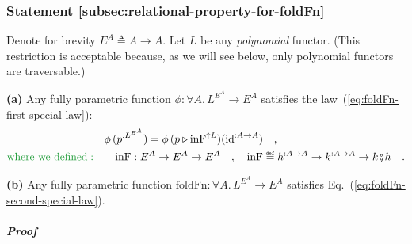 \subsubsection{Statement \label{subsec:relational-property-for-foldFn}\ref{subsec:relational-property-for-foldFn}}

Denote for brevity $E^{A}\triangleq A\rightarrow A$. Let $L$ be
any \emph{polynomial} functor. (This restriction is acceptable because,
as we will see below, only polynomial functors are traversable.)

\textbf{(a)} Any fully parametric function $\phi:\forall A.\,L^{E^{A}}\rightarrow E^{A}$
satisfies the law~(\ref{eq:foldFn-first-special-law}):
\begin{align}
 & \phi\,(p^{:L^{E^{A}}})=\phi\,(p\triangleright\text{inF}^{\uparrow L})(\text{id}^{:A\rightarrow A})\quad,\label{eq:first-special-law-of-phi}\\
{\color{greenunder}\text{where we defined}:}\quad & \quad\text{inF}:E^{A}\rightarrow E^{A}\rightarrow E^{A}\quad,\quad\text{inF}\triangleq h^{:A\rightarrow A}\rightarrow k^{:A\rightarrow A}\rightarrow k\bef h\quad.\nonumber 
\end{align}

\textbf{(b)} Any fully parametric function $\text{foldFn}:\forall A.\,L^{E^{A}}\rightarrow E^{A}$
satisfies Eq.~(\ref{eq:foldFn-second-special-law}).

\subparagraph{Proof}

